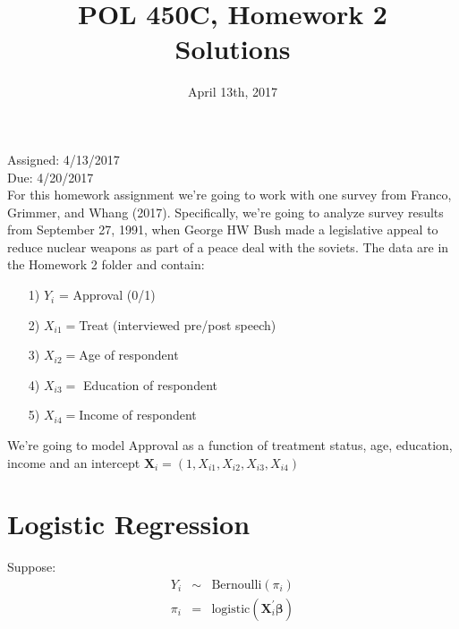 \documentclass[letterpaper,12pt]{article}
\title{POL 450C, Homework 2 \\ Solutions}
\date{April 13th, 2017}
\numberwithin{equation}{section}
\numberwithin{equation}{section}
\begin{document}
\maketitle

\noindent Assigned: 4/13/2017\\
Due: 4/20/2017\\


\noindent For this homework assignment we're going to work with one survey from Franco, Grimmer, and Whang (2017).  Specifically, we're going to analyze survey results from September 27, 1991, when George HW Bush made a legislative appeal to reduce nuclear weapons as part of a peace deal with the soviets. The data are in the Homework 2 folder and contain:

\begin{itemize}
\item[1)] $Y_{i} $ = Approval (0/1)
\item[2)] $X_{i1} = $Treat (interviewed pre/post speech)
\item[3)] $X_{i2} = $Age of respondent
\item[4)] $X_{i3} = $ Education of respondent
\item[5)] $X_{i4} = $Income of respondent
\end{itemize}

We're going to model Approval as a function of treatment status, age, education, income and an intercept $\boldsymbol{X}_{i}= (1, X_{i1}, X_{i2}, X_{i3}, X_{i4})$

\section{Logistic Regression}
Suppose:
\begin{eqnarray}
Y_{i} & \sim & \text{Bernoulli}(\pi_{i})\nonumber \\
\pi_{i} & = & \text{logistic}(\boldsymbol{X}_{i}^{'}\boldsymbol{\beta}) \nonumber
\end{eqnarray}
\end{document}
